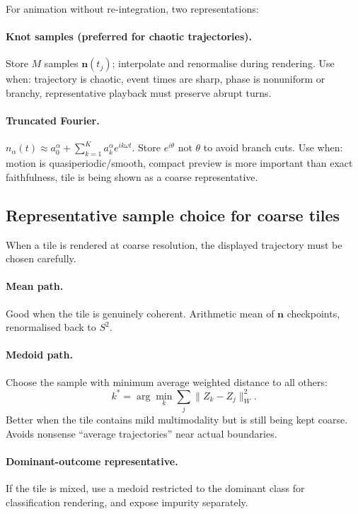 \documentclass[11pt]{report}
\begin{document}
For animation without re-integration, two representations:

\paragraph{Knot samples (preferred for chaotic trajectories).} Store $M$ samples $\mathbf n(t_j)$; interpolate and renormalise during rendering. Use when: trajectory is chaotic, event times are sharp, phase is nonuniform or branchy, representative playback must preserve abrupt turns.

\paragraph{Truncated Fourier.} $n_\alpha(t)\approx a_0^\alpha+\sum_{k=1}^K a_k^\alpha e^{ik\omega t}$. Store $e^{i\theta}$ not $\theta$ to avoid branch cuts. Use when: motion is quasiperiodic/smooth, compact preview is more important than exact faithfulness, tile is being shown as a coarse representative.

\subsection{Representative sample choice for coarse tiles}
\label{sec:representative}

When a tile is rendered at coarse resolution, the displayed trajectory must be chosen carefully.

\paragraph{Mean path.} Good when the tile is genuinely coherent. Arithmetic mean of $\mathbf n$ checkpoints, renormalised back to $S^2$.

\paragraph{Medoid path.} Choose the sample with minimum average weighted distance to all others:
\[
k^*=\arg\min_k\sum_j\|Z_k-Z_j\|_W^2.
\]
Better when the tile contains mild multimodality but is still being kept coarse. Avoids nonsense ``average trajectories'' near actual boundaries.

\paragraph{Dominant-outcome representative.} If the tile is mixed, use a medoid restricted to the dominant class for classification rendering, and expose impurity separately.
\end{document}
